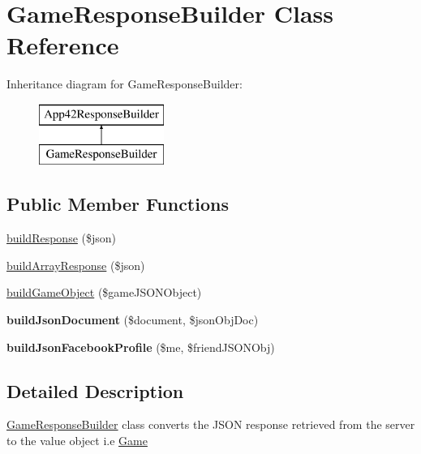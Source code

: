 \hypertarget{class_game_response_builder}{\section{Game\+Response\+Builder Class Reference}
\label{class_game_response_builder}
}
Inheritance diagram for Game\+Response\+Builder\+:\begin{figure}[H]
\begin{center}
\leavevmode
\includegraphics[height=2.000000cm]{class_game_response_builder}
\end{center}
\end{figure}
\subsection*{Public Member Functions}
\begin{DoxyCompactItemize}
\item 
\hyperlink{class_game_response_builder_a8bc94acdaada04a52b74b8f9afb25c4c}{build\+Response} (\$json)
\item 
\hyperlink{class_game_response_builder_a901d0fc914904a6314c201378ce5f763}{build\+Array\+Response} (\$json)
\item 
\hyperlink{class_game_response_builder_abd1e199858fbe0a024d8e83319e3e618}{build\+Game\+Object} (\$game\+J\+S\+O\+N\+Object)
\item 
\hypertarget{class_game_response_builder_aa4376e59cd7a74858e26c8f3bdae6c7c}{{\bfseries build\+Json\+Document} (\$document, \$json\+Obj\+Doc)}\label{class_game_response_builder_aa4376e59cd7a74858e26c8f3bdae6c7c}

\item 
\hypertarget{class_game_response_builder_a407ce44f9d28d031a70ec14144326e5a}{{\bfseries build\+Json\+Facebook\+Profile} (\$me, \$friend\+J\+S\+O\+N\+Obj)}\label{class_game_response_builder_a407ce44f9d28d031a70ec14144326e5a}

\end{DoxyCompactItemize}


\subsection{Detailed Description}
\hyperlink{class_game_response_builder}{Game\+Response\+Builder} class converts the J\+S\+O\+N response retrieved from the server to the value object i.\+e \hyperlink{class_game}{Game} 

